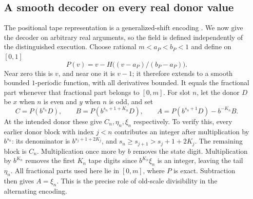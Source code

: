 \subsection{A smooth decoder on every real donor value}
The positional tape representation is a generalized-shift encoding
\cite{Moore}. We now give the decoder on arbitrary real arguments,
so the field is defined independently of the distinguished execution.
Choose rational $m<a_P<b_P<1$ and define on $[0,1]$
\[
 P(v)=v-H\bigl((v-a_P)/(b_P-a_P)\bigr).
\]
Near zero this is $v$, and near one it is $v-1$; it therefore extends
to a smooth bounded $1$-periodic function, with all derivatives bounded.
It equals the fractional part whenever that fractional part belongs to
$[0,m]$.  For slot $n$, let the donor $D$ be $x$ when $n$ is even and
$y$ when $n$ is odd, and set
\begin{equation}
 C=P(b^{s_n}D),\qquad B=P(b^{s_n+1+K_n}D),\qquad
 A=P(b^{s_n+1}D)-b^{-K_n}B.
 \label{eq:alternating-read}
\end{equation}
At the intended donor these give $C_n,\eta_n,\xi_n$ respectively.
To verify this, every earlier donor block with index $j<n$ contributes
an integer after multiplication by $b^{s_n}$: its denominator is
$b^{s_j+1+2K_j}$, and
$s_n\geq s_{j+1}>s_j+1+2K_j$.  The remaining block is $C_n$.
Multiplication once more by $b$ removes the state digit.  Multiplication
by $b^{K_n}$ removes the first $K_n$ tape digits since
$b^{K_n}\xi_n$ is an integer, leaving the tail $\eta_n$.
All fractional parts used here lie in $[0,m]$, where $P$ is exact.
Subtraction then gives $A=\xi_n$.  This is the precise role of old-scale
divisibility in the alternating encoding.

